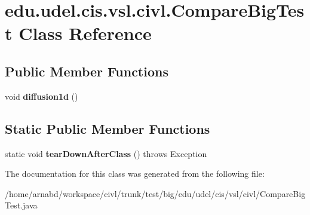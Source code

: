 \hypertarget{classedu_1_1udel_1_1cis_1_1vsl_1_1civl_1_1CompareBigTest}{}\section{edu.\+udel.\+cis.\+vsl.\+civl.\+Compare\+Big\+Test Class Reference}
\label{classedu_1_1udel_1_1cis_1_1vsl_1_1civl_1_1CompareBigTest}
\subsection*{Public Member Functions}
\begin{DoxyCompactItemize}
\item 
\hypertarget{classedu_1_1udel_1_1cis_1_1vsl_1_1civl_1_1CompareBigTest_ac152601019b056345a4b7d4349b94a1d}{}void {\bfseries diffusion1d} ()\label{classedu_1_1udel_1_1cis_1_1vsl_1_1civl_1_1CompareBigTest_ac152601019b056345a4b7d4349b94a1d}

\end{DoxyCompactItemize}
\subsection*{Static Public Member Functions}
\begin{DoxyCompactItemize}
\item 
\hypertarget{classedu_1_1udel_1_1cis_1_1vsl_1_1civl_1_1CompareBigTest_a677f0c61cae57758ed45a97a682e33d6}{}static void {\bfseries tear\+Down\+After\+Class} ()  throws Exception \label{classedu_1_1udel_1_1cis_1_1vsl_1_1civl_1_1CompareBigTest_a677f0c61cae57758ed45a97a682e33d6}

\end{DoxyCompactItemize}


The documentation for this class was generated from the following file\+:\begin{DoxyCompactItemize}
\item 
/home/arnabd/workspace/civl/trunk/test/big/edu/udel/cis/vsl/civl/Compare\+Big\+Test.\+java\end{DoxyCompactItemize}
